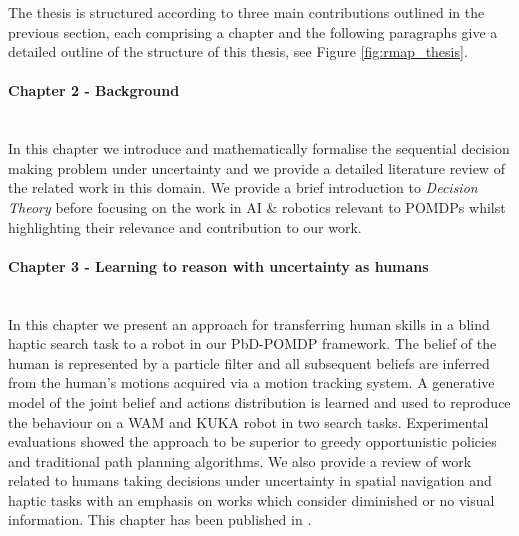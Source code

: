The thesis is structured according to three main contributions outlined in the previous section, 
each comprising a chapter and the following paragraphs give a detailed outline of the structure 
of this thesis, see Figure \ref{fig:rmap_thesis}.

\begin{minipage}[c]{0.9\textwidth}
\paragraph{Chapter 2 - Background}\\
In this chapter we introduce and mathematically formalise the sequential decision making problem 
under uncertainty and we provide a detailed literature review of the related work in this domain.
We provide a brief introduction to \textit{Decision Theory} before focusing on the work 
in AI \& robotics relevant to POMDPs whilst highlighting their relevance and contribution to our work. 
\end{minipage}

\begin{minipage}[c]{0.9\textwidth}
\paragraph{Chapter 3 - Learning to reason with uncertainty as humans}\\
In this chapter we present an approach for transferring human skills in a blind haptic 
search task to a robot in our PbD-POMDP framework. The belief of the human is represented by a particle filter and 
all subsequent beliefs are inferred from the human's motions acquired via a motion tracking
system. A generative model of the joint belief and actions distribution is learned and used
to reproduce the behaviour on a WAM and KUKA robot in two search tasks. Experimental 
evaluations showed the approach to be superior to greedy opportunistic policies and traditional
path planning algorithms. 
We also provide a review of work related to humans taking decisions under uncertainty 
in spatial navigation and haptic tasks with an emphasis on works which consider diminished or no 
visual information. This chapter has been published in \cite{deChambrierBillard2013,Chambrier2014}.
\end{minipage}

